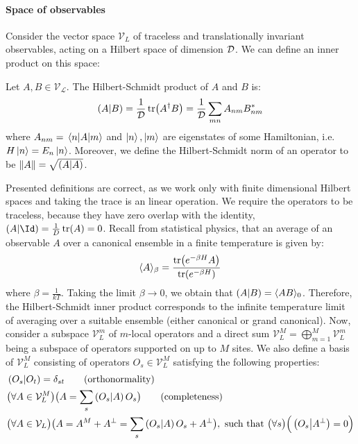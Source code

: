 \paragraph{Space of observables}Consider the vector space \(\mathcal{V}_L\) of traceless and translationally invariant
observables, acting on a Hilbert space of dimension \(\mathcal{D}\). We can define an inner product on this space:
\begin{definition}
  Let \(A,B \in \mathcal{V_L}\). The Hilbert-Schmidt product of \(A\) and \(B\) is:
  \begin{equation}
    \left(A \middle| B\right) = \frac{1}{\mathcal{D}}\tr(A^{\dagger}B) = \frac{1}{\mathcal{D}} \sum_{mn} A_{nm}B_{nm}^{\ast}
  \end{equation}
  where \(A_{nm} = \matrixel{n}{A}{m}\) and \(\ket{n},\ket{m}\) are eigenstates of some Hamiltonian,
  i.e.\ \(H\ket{n} = E_n \ket{n}\).
  Moreover, we define the Hilbert-Schmidt norm of an operator to be \(\norm{A} = \sqrt{\left(A \middle| A\right)}\).
\end{definition}
Presented definitions are correct, as we work only with finite dimensional Hilbert spaces and taking
the trace is an linear operation. We require the operators to be traceless, because they have zero 
overlap with the identity, \(\left(A|\Id\right)=\frac{1}{D}\tr(A) = 0\).
Recall from statistical physics, that an average of an observable \(A\) over a canonical ensemble
in a finite temperature is given by:
\begin{equation}
  \langle A \rangle_{\beta} = \frac{\tr(e^{-\beta H}A)}{\tr(e^{-\beta H})}
\end{equation}
where \(\beta = \frac{1}{kT}\).
Taking the limit \(\beta \to 0\), we obtain that \(\left(A \middle| B\right) =  \langle AB \rangle_{0}\).
Therefore, the Hilbert-Schmidt inner product corresponds to the infinite temperature 
limit of averaging over a suitable ensemble (either canonical or grand canonical).
Now, consider a subspace \(\mathcal{V}_L^m\) of \(m\)-local operators and a direct sum
\(\mathcal{V}_L^M = \bigoplus_{m = 1}^M \mathcal{V}_L^m\) being a subspace of operators supported on up to \(M\) sites.
We also define a basis of \(\mathcal{V}_L^M\) consisting of operators \(O_s\in \mathcal{V}_L^M\)
satisfying the following properties:
\begin{align}
   & \hs{O_s}{O_{t}} = \delta_{st} \tag{\text{orthonormality}}                                    \nonumber{}\\
   & \big(\forall A \in \mathcal{V}_L^M\big) \big(A = \sum_s \hs{O_s}{A} O_s\big) \tag{\text{completeness}}   \nonumber{}\\
   & \big(\forall A \in \mathcal{V}_L \big) \big( A = A^M + A^{\perp} = \sum_s \hs{O_s}{A} O_s + A^{\perp}\big) ,
  \text{ such that } \big(\forall s\big) \Big( \hs{O_s}{A^{\perp}} = 0\Big)\label{eq:basis}
\end{align}


